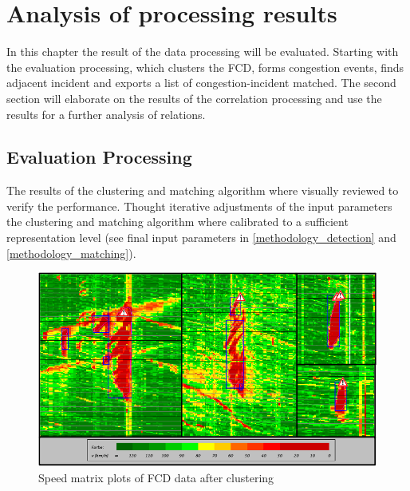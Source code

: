 \chapter{Analysis of processing results}
\label{analysis_processing}
In this chapter the result of the data processing will be evaluated. Starting with the evaluation processing, which clusters the FCD, forms congestion events, finds adjacent incident and exports a list of congestion-incident matched. The second section will elaborate on the results of the correlation processing and use the results for a further analysis of relations.

\section{Evaluation Processing}
\label{analysis_processing_evaluation}
The results of the clustering and matching algorithm where visually reviewed to verify the performance. Thought iterative adjustments of the input parameters the clustering and matching algorithm where calibrated to a sufficient representation level (see final input parameters in \cref{methodology_detection} and \cref{methodology_matching}).

\begin{figure}[ht!]
	\centering
	\includegraphics[scale=0.9]{images/cluster_final.png}
	\caption{Speed matrix plots of FCD data after clustering}
	\label{img:speedMatrixPlot_final_good}
\end{figure}

